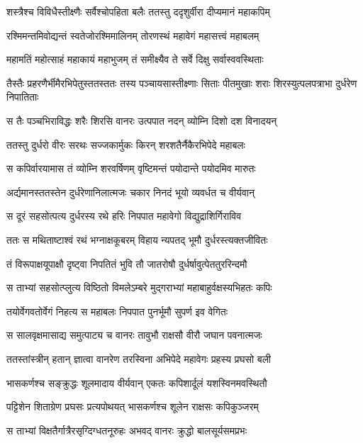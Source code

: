 \twolineshloka
{शस्त्रैश्च विविधैस्तीक्ष्णैः सर्वैश्चोपहिता बलैः}
{ततस्तु ददृशुर्वीरा दीप्यमानं महाकपिम्} %

\twolineshloka
{रश्मिमन्तमिवोद्यन्तं स्वतेजोरश्मिमालिनम्}
{तोरणस्थं महावेगं महासत्त्वं महाबलम्} %

\twolineshloka
{महामतिं महोत्साहं महाकायं महाभुजम्}
{तं समीक्ष्यैव ते सर्वे दिक्षु सर्वास्ववस्थिताः} %

\threelineshloka
{तैस्तैः प्रहरणैर्भीमैरभिपेतुस्ततस्ततः}
{तस्य पञ्चायसास्तीक्ष्णाः सिताः पीतमुखाः शराः}
{शिरस्युत्पलपत्राभा दुर्धरेण निपातिताः} %

\twolineshloka
{स तैः पञ्चभिराविद्धः शरैः शिरसि वानरः}
{उत्पपात नदन् व्योम्नि दिशो दश विनादयन्} %

\twolineshloka
{ततस्तु दुर्धरो वीरः सरथः सज्जकार्मुकः}
{किरन् शरशतैर्नैकैरभिपेदे महाबलः} %

\twolineshloka
{स कपिर्वारयामास तं व्योम्नि शरवर्षिणम्}
{वृष्टिमन्तं पयोदान्ते पयोदमिव मारुतः} %

\twolineshloka
{अर्द्यमानस्ततस्तेन दुर्धरेणानिलात्मजः}
{चकार निनदं भूयो व्यवर्धत च वीर्यवान्} %

\twolineshloka
{स दूरं सहसोत्पत्य दुर्धरस्य रथे हरिः}
{निपपात महावेगो विद्युद्राशिर्गिराविव} %

\twolineshloka
{ततः स मथिताष्टाश्वं रथं भग्नाक्षकूबरम्}
{विहाय न्यपतद् भूमौ दुर्धरस्त्यक्तजीवितः} %

\twolineshloka
{तं विरूपाक्षयूपाक्षौ दृष्ट्वा निपतितं भुवि}
{तौ जातरोषौ दुर्धर्षावुत्पेततुररिन्दमौ} %

\twolineshloka
{स ताभ्यां सहसोत्प्लुत्य विष्ठितो विमलेऽम्बरे}
{मुद्गराभ्यां महाबाहुर्वक्षस्यभिहतः कपिः} %

\twolineshloka
{तयोर्वेगवतोर्वेगं निहत्य स महाबलः}
{निपपात पुनर्भूमौ सुपर्ण इव वेगितः} %

\twolineshloka
{स सालवृक्षमासाद्य समुत्पाट्य च वानरः}
{तावुभौ राक्षसौ वीरौ जघान पवनात्मजः} %

\twolineshloka
{ततस्तांस्त्रीन् हतान् ज्ञात्वा वानरेण तरस्विना}
{अभिपेदे महावेगः प्रहस्य प्रघसो बली} %

\twolineshloka
{भासकर्णश्च सङ्क्रुद्धः शूलमादाय वीर्यवान्}
{एकतः कपिशार्दूलं यशस्विनमवस्थितौ} %

\twolineshloka
{पट्टिशेन शिताग्रेण प्रघसः प्रत्यपोथयत्}
{भासकर्णश्च शूलेन राक्षसः कपिकुञ्जरम्} %

\twolineshloka
{स ताभ्यां विक्षतैर्गात्रैरसृग्दिग्धतनूरुहः}
{अभवद् वानरः क्रुद्धो बालसूर्यसमप्रभः} %

